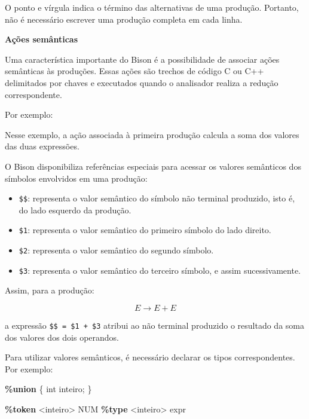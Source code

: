 \documentclass[
  brazilian,
  letterpaper,
]{book}
\newenvironment{Shaded}{\begin{snugshade}}{\end{snugshade}}
\newcommand{\DataTypeTok}[1]{\textcolor[rgb]{0.68,0.00,0.00}{#1}}
\newcommand{\KeywordTok}[1]{\textcolor[rgb]{0.00,0.23,0.31}{\textbf{#1}}}
\newcommand{\NormalTok}[1]{\textcolor[rgb]{0.00,0.23,0.31}{#1}}
\newcommand{\OperatorTok}[1]{\textcolor[rgb]{0.37,0.37,0.37}{#1}}
\providecommand{\tightlist}{%
  \setlength{\itemsep}{0pt}\setlength{\parskip}{0pt}}
\theoremstyle{plain}
\theoremstyle{definition}
\theoremstyle{remark}
\begin{document}
O ponto e vírgula indica o término das alternativas de uma produção.
Portanto, não é necessário escrever uma produção completa em cada linha.

\textbf{Ações semânticas}

Uma característica importante do Bison é a possibilidade de associar
ações semânticas às produções. Essas ações são trechos de código C ou
C++ delimitados por chaves e executados quando o analisador realiza a
redução correspondente.

Por exemplo:

\begin{Shaded}
\end{Shaded}

Nesse exemplo, a ação associada à primeira produção calcula a soma dos
valores das duas expressões.

O Bison disponibiliza referências especiais para acessar os valores
semânticos dos símbolos envolvidos em uma produção:

\begin{itemize}
\tightlist
\item
  \texttt{\$\$}: representa o valor semântico do símbolo não terminal
  produzido, isto é, do lado esquerdo da produção.
\item
  \texttt{\$1}: representa o valor semântico do primeiro símbolo do lado
  direito.
\item
  \texttt{\$2}: representa o valor semântico do segundo símbolo.
\item
  \texttt{\$3}: representa o valor semântico do terceiro símbolo, e
  assim sucessivamente.
\end{itemize}

Assim, para a produção:

\[
E\rightarrow E+E
\]

a expressão \texttt{\$\$\ =\ \$1\ +\ \$3} atribui ao não terminal
produzido o resultado da soma dos valores dos dois operandos.

Para utilizar valores semânticos, é necessário declarar os tipos
correspondentes. Por exemplo:

\begin{Shaded}
\begin{Highlighting}[]
\KeywordTok{\%union}\NormalTok{ \{}
    \DataTypeTok{int}\NormalTok{ inteiro}\OperatorTok{;}
\NormalTok{\}}

\KeywordTok{\%token} \DataTypeTok{\textless{}inteiro\textgreater{}}\NormalTok{ NUM}
\KeywordTok{\%type} \DataTypeTok{\textless{}inteiro\textgreater{}}\NormalTok{ expr}
\end{Highlighting}
\end{Shaded}
\end{document}
